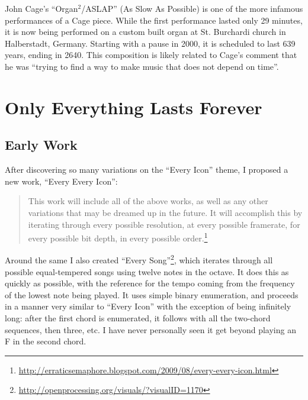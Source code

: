 \documentclass{thesis}
\begin{document}
	John Cage's ``Organ$^2$/ASLAP'' (As Slow As Possible)\cite{john_cage_as_????} is one of the more infamous performances of a Cage piece. While the first performance lasted only 29 minutes, it is now being performed on a custom built organ at St. Burchardi church in Halberstadt, Germany. Starting with a pause in 2000, it is scheduled to last 639 years, ending in 2640. This composition is likely related to Cage's comment that he was ``trying to find a way to make music that does not depend on time''.
				
\chapter{Only Everything Lasts Forever}

\section{Early Work}

	After discovering so many variations on the ``Every Icon'' theme, I proposed a new work, ``Every Every Icon'':
	
	\begin{quote}
	This work will include all of the above works, as well as any other variations that may be dreamed up in the future. It will accomplish this by iterating through every possible resolution, at every possible framerate, for every possible bit depth, in every possible order.\footnote{\url{http://erraticsemaphore.blogspot.com/2009/08/every-every-icon.html}}
	\end{quote}
	
	Around the same I also created ``Every Song''\footnote{\url{http://openprocessing.org/visuals/?visualID=1170}}, which iterates through all possible equal-tempered songs using twelve notes in the octave. It does this as quickly as possible, with the reference for the tempo coming from the frequency of the lowest note being played. It uses simple binary enumeration, and proceeds in a manner very similar to ``Every Icon'' with the exception of being infinitely long: after the first chord is enumerated, it follows with all the two-chord sequences, then three, etc. I have never personally seen it get beyond playing an F in the second chord.
\end{document}
